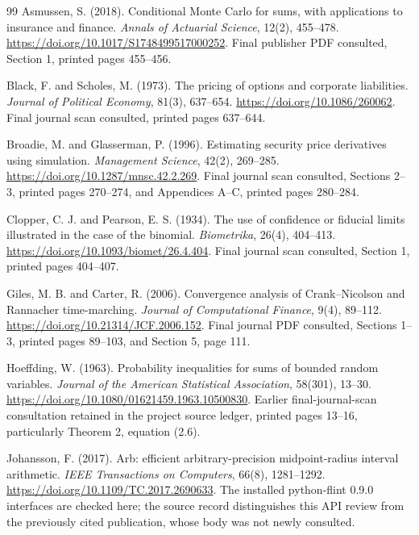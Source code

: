 \documentclass[11pt]{article}
\begin{document}
\begin{thebibliography}{99}
Asmussen, S. (2018). Conditional Monte Carlo for sums, with applications to insurance and finance. \emph{Annals of Actuarial Science}, 12(2), 455--478. \url{https://doi.org/10.1017/S1748499517000252}. Final publisher PDF consulted, Section 1, printed pages 455--456.

Black, F. and Scholes, M. (1973). The pricing of options and corporate liabilities. \emph{Journal of Political Economy}, 81(3), 637--654. \url{https://doi.org/10.1086/260062}. Final journal scan consulted, printed pages 637--644.

Broadie, M. and Glasserman, P. (1996). Estimating security price derivatives using simulation. \emph{Management Science}, 42(2), 269--285. \url{https://doi.org/10.1287/mnsc.42.2.269}. Final journal scan consulted, Sections 2--3, printed pages 270--274, and Appendices A--C, printed pages 280--284.

Clopper, C. J. and Pearson, E. S. (1934). The use of confidence or fiducial limits illustrated in the case of the binomial. \emph{Biometrika}, 26(4), 404--413. \url{https://doi.org/10.1093/biomet/26.4.404}. Final journal scan consulted, Section 1, printed pages 404--407.

Giles, M. B. and Carter, R. (2006). Convergence analysis of Crank--Nicolson and Rannacher time-marching. \emph{Journal of Computational Finance}, 9(4), 89--112. \url{https://doi.org/10.21314/JCF.2006.152}. Final journal PDF consulted, Sections 1--3, printed pages 89--103, and Section 5, page 111.

 Hoeffding, W. (1963). Probability inequalities for sums of bounded random variables. \emph{Journal of the American Statistical Association}, 58(301), 13--30. \url{https://doi.org/10.1080/01621459.1963.10500830}. Earlier final-journal-scan consultation retained in the project source ledger, printed pages 13--16, particularly Theorem 2, equation (2.6).

Johansson, F. (2017). Arb: efficient arbitrary-precision midpoint-radius interval arithmetic. \emph{IEEE Transactions on Computers}, 66(8), 1281--1292. \url{https://doi.org/10.1109/TC.2017.2690633}. The installed python-flint 0.9.0 interfaces are checked here; the source record distinguishes this API review from the previously cited publication, whose body was not newly consulted.


\end{thebibliography}
\end{document}
